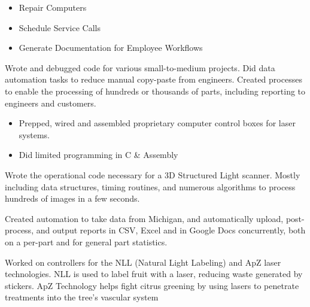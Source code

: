 \documentclass[10pt,letterpaper,ragged2e,withhyper]{altacv}
\begin{document}
\begin{paracol}{2}

\begin{itemize}
\item Repair Computers
\item Schedule Service Calls
\item Generate Documentation for Employee Workflows
\end{itemize}

Wrote and debugged code for various small-to-medium projects.
Did data automation tasks to reduce manual copy-paste from engineers.
Created processes to enable the processing of hundreds or thousands of parts,
including reporting to engineers and customers.

\begin{itemize}
\item Prepped, wired and assembled proprietary computer control boxes for laser systems.
\item Did limited programming in C \& Assembly
\end{itemize}


Wrote the operational code necessary for a 3D Structured Light scanner.
Mostly including data structures, timing routines, and numerous algorithms
to process hundreds of images in a few seconds.

Created automation to take data from Michigan,
and automatically upload, post-process, and output reports in CSV,
Excel and in Google Docs concurrently, both on a per-part and for
general part statistics.

Worked on controllers for the NLL (Natural Light Labeling) and ApZ laser technologies.
NLL is used to label fruit with a laser, reducing waste generated by stickers.
ApZ Technology helps fight citrus greening by using lasers to penetrate treatments into the tree’s vascular system


\end{paracol}
\end{document}
